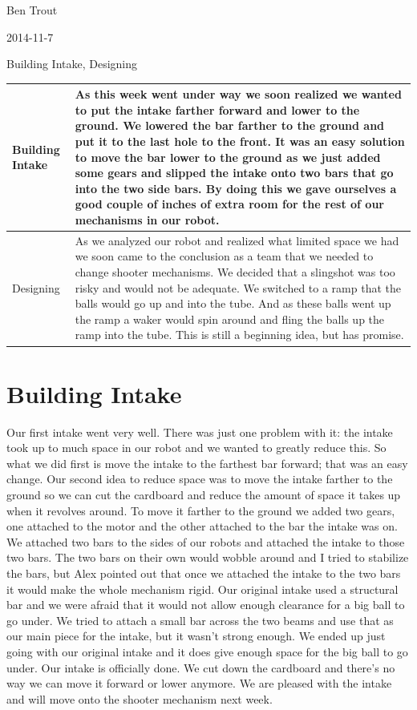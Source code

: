 Ben Trout

2014-11-7

Building Intake, Designing 

\begin{tabular}{|p{5cm}|p{5cm}|}
\hline
Building Intake&
As this week went under way we soon realized we wanted to put the intake farther forward and lower to the ground. We lowered the bar farther to the ground and put it to the last hole to the front. It was an easy solution to move the bar lower to the ground as we just added some gears and slipped the intake onto two bars that go into the two side bars. By doing this we gave ourselves a good couple of inches of extra room for the rest of our mechanisms in our robot. 
\\
\hline
Designing&
As we analyzed our robot and realized what limited space we had we soon came to the conclusion as a team that we needed to change shooter mechanisms. We decided that a slingshot was too risky and would not be adequate. We switched to a ramp that the balls would go up and into the tube. And as these balls went up the ramp a waker would spin around and fling the balls up the ramp into the tube. This is still a beginning idea, but has promise. 
\\
\hline
\end{tabular}

\section*{Building Intake}
Our first intake went very well. There was just one problem with it: the intake took up to much space in our robot and we wanted to greatly reduce this. So what we did first is move the intake to the farthest bar forward; that was an easy change. Our second idea to reduce space was to move the intake farther to the ground so we can cut the cardboard and reduce the amount of space it takes up when it revolves around. To move it farther to the ground we added two gears, one attached to the motor and the other attached to the bar the intake was on. We attached two bars to the sides of our robots and attached the intake to those two bars. The two bars on their own would wobble around and I tried to stabilize the bars, but Alex pointed out that once we attached the intake to the two bars it would make the whole mechanism rigid.  Our original intake used a structural bar and we were afraid that it would not allow enough clearance for a big ball to go under. We tried to attach a small bar across the two beams and use that as our main piece for the intake, but it wasn’t strong enough. We ended up just going with our original intake and it does give enough space for the big ball to go under. Our intake is officially done. We cut down the cardboard and there's no way we can move it forward or lower anymore. We are pleased with the intake and will move onto the shooter mechanism next week. 

